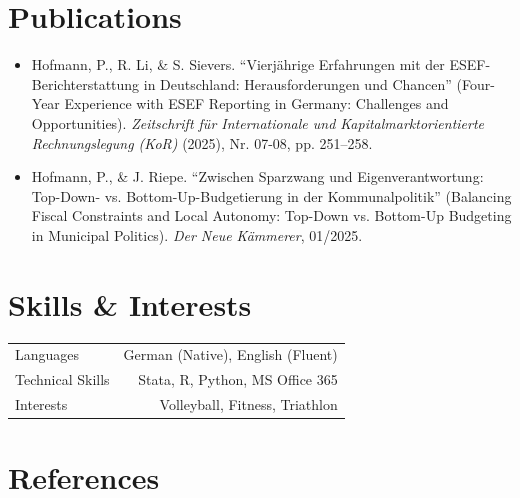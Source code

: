 \documentclass[11pt, a4paper]{article}
\begin{document}
\section*{Publications}

\begin{itemize}[nosep, leftmargin=1.5em, label={$\bullet$}, itemsep=6pt]
    \item Hofmann, P., R. Li, \& S. Sievers. ``Vierjährige Erfahrungen mit der ESEF-Berichterstattung in Deutschland: Herausforderungen und Chancen'' (Four-Year Experience with ESEF Reporting in Germany: Challenges and Opportunities). \emph{Zeitschrift für Internationale und Kapitalmarktorientierte Rechnungslegung (KoR)} (2025), Nr. 07-08, pp. 251–258.
    
    \item Hofmann, P., \& J. Riepe. ``Zwischen Sparzwang und Eigenverantwortung: Top-Down- vs. Bottom-Up-Budgetierung in der Kommunalpolitik'' (Balancing Fiscal Constraints and Local Autonomy: Top-Down vs. Bottom-Up Budgeting in Municipal Politics).  \emph{Der Neue Kämmerer}, 01/2025.
\end{itemize}

\section*{Skills \& Interests}

\begin{longtable}{L R}
    Languages & German (Native), English (Fluent) \\
    Technical Skills & Stata, R, Python, MS Office 365 \\
    Interests & Volleyball, Fitness, Triathlon \\
\end{longtable}

\section*{References}
\end{document}
